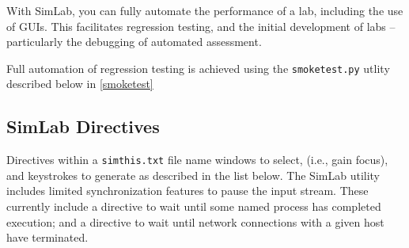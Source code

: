 \documentclass[12pt]{article}
\begin{document}
With SimLab, you can fully automate the performance of a lab, including the use of GUIs.
This facilitates regression testing, and the initial development of labs -- particularly
the debugging of automated assessment.   

Full automation of regression testing is achieved using the {\tt smoketest.py} utlity
described below in \ref{smoketest}

\subsection {SimLab Directives}
Directives within a {\tt simthis.txt} file name windows to select, (i.e., gain focus),
and keystrokes to generate as described in the list below.  The SimLab utility includes
limited synchronization features to pause the input stream.  These currently include a
directive to wait until some named process has completed execution; and a directive to wait
until network connections with a given host have terminated.
\end{document}
